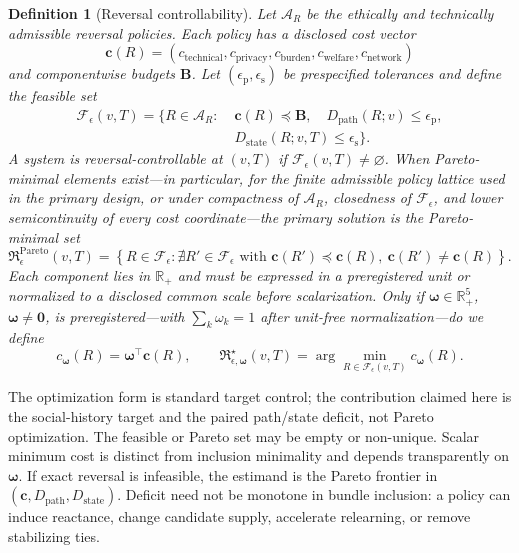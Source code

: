 \documentclass[pdflatex,sn-mathphys-num]{sn-jnl}
\newtheorem{definition}{Definition}
\begin{document}
\begin{definition}[Reversal controllability]
Let $\mathcal A_R$ be the ethically and technically admissible reversal policies. Each policy has a disclosed cost vector
\begin{equation}
\bm c(R)=(c_{\mathrm{technical}},c_{\mathrm{privacy}},c_{\mathrm{burden}},
c_{\mathrm{welfare}},c_{\mathrm{network}})
\end{equation}
and componentwise budgets $\bm B$. Let $(\epsilon_{\mathrm p},\epsilon_{\mathrm s})$ be prespecified tolerances and define the feasible set
\begin{equation}
\begin{aligned}
\mathcal F_\epsilon(v,T)=\{R\in\mathcal A_R:\;&
\bm c(R)\preceq\bm B,\quad D_{\mathrm{path}}(R;v)\leq\epsilon_{\mathrm p},\\
&D_{\mathrm{state}}(R;v,T)\leq\epsilon_{\mathrm s}\}.
\end{aligned}
\end{equation}
A system is reversal-controllable at $(v,T)$ if $\mathcal F_\epsilon(v,T)\neq\varnothing$. When Pareto-minimal elements exist---in particular, for the finite admissible policy lattice used in the primary design, or under compactness of $\mathcal A_R$, closedness of $\mathcal F_\epsilon$, and lower semicontinuity of every cost coordinate---the primary solution is the Pareto-minimal set
\begin{equation}
\mathfrak R^{\mathrm{Pareto}}_\epsilon(v,T)=
\left\{R\in\mathcal F_\epsilon:\nexists R'\in\mathcal F_\epsilon
\text{ with }\bm c(R')\preceq\bm c(R),\ \bm c(R')\neq\bm c(R)\right\}.
\label{eq:minimum-reversal-bundle}
\end{equation}
Each component lies in $\mathbb R_+$ and must be expressed in a preregistered unit or normalized to a disclosed common scale before scalarization. Only if $\bm\omega\in\mathbb R_+^5$, $\bm\omega\neq\bm0$, is preregistered---with $\sum_k\omega_k=1$ after unit-free normalization---do we define
\begin{equation}
c_{\bm\omega}(R)=\bm\omega^\top\bm c(R),\qquad
\mathfrak R^\star_{\epsilon,\bm\omega}(v,T)=
\arg\min_{R\in\mathcal F_\epsilon(v,T)}c_{\bm\omega}(R).
\end{equation}
\end{definition}

The optimization form is standard target control; the contribution claimed here is the social-history target and the paired path/state deficit, not Pareto optimization. The feasible or Pareto set may be empty or non-unique. Scalar minimum cost is distinct from inclusion minimality and depends transparently on $\bm\omega$. If exact reversal is infeasible, the estimand is the Pareto frontier in $(\bm c,D_{\mathrm{path}},D_{\mathrm{state}})$. Deficit need not be monotone in bundle inclusion: a policy can induce reactance, change candidate supply, accelerate relearning, or remove stabilizing ties.
\end{document}
